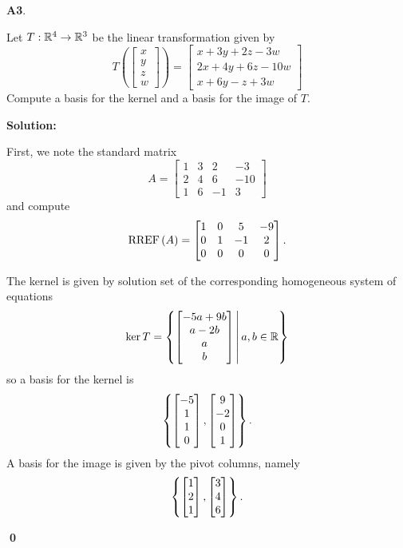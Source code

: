 \documentclass{article}
\newenvironment{problem}[1]
{
  \begin{flushleft}
  \textbf{#1}.
  \ignorespaces
}
{
  \end{flushleft}
}
\newenvironment{solution}
{
  \ignorespaces
  \textbf{Solution:}
}
{
  \ignorespacesafterend
  \begin{flushright}
  {\bfseries \qed}
  \end{flushright}
}
\begin{document}
\begin{problem}{A3}
Let \(T: \mathbb{R}^4 \rightarrow \mathbb{R}^3\) be the linear transformation given by
\[
  T\left(\begin{bmatrix}x\\y\\z\\w\end{bmatrix} \right) =
  \begin{bmatrix}
    x+3y+2z-3w \\
    2x+4y+6z-10w \\
    x+6y-z+3w
  \end{bmatrix}
\]
Compute a basis for the kernel and a basis for the image of \(T\).
\end{problem}
\begin{solution}
First, we note the standard matrix
\[A=\begin{bmatrix}1 & 3 & 2 & -3 \\ 2 & 4 & 6 & -10 \\ 1 & 6 & -1 & 3 \end{bmatrix}\]
and compute
\[\operatorname{RREF}\left(A\right) = \begin{bmatrix} 1 & 0 & 5 & -9 \\ 0 & 1 & -1 & 2 \\ 0 & 0 & 0 & 0\end{bmatrix}.\]

The kernel is given by solution set of the corresponding homogeneous system of equations
\[ \ker T = \left\{\begin{bmatrix}-5a+9b \\ a-2b \\ a \\ b \end{bmatrix}\,\middle|\,a,b \in \mathbb{R}\right\} \]
so a basis for the kernel is
\[\left\{\begin{bmatrix}-5 \\ 1 \\ 1 \\ 0 \end{bmatrix},
\begin{bmatrix}9 \\ -2 \\ 0 \\ 1 \end{bmatrix}\right\}.\]
A basis for the image is given by the pivot columns, namely
\[\left\{\begin{bmatrix}1\\2\\1 \end{bmatrix},
\begin{bmatrix}3\\4\\6 \end{bmatrix}\right\}.\]
\end{solution}
\end{document}
